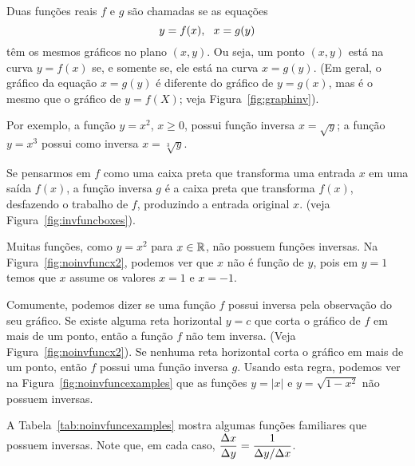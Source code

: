 Duas funções reais $f$ e $g$ são chamadas  se as
equações
$$
  y = f(x), \hspace{1.5ex} x = g(y)
$$
têm os mesmos gráficos no plano $(x, y)$. Ou seja, um ponto $(x, y)$ está na
curva $y = f(x)$ se, e somente se, ele está na curva $x = g(y)$. (Em geral,
o gráfico da equação $x = g(y)$ é diferente do gráfico de $y = g(x)$, mas é
o mesmo que o gráfico de $y = f(X)$; veja Figura~\ref{fig:graphinv}).


Por exemplo, a função $y = x^2$, $x \ge 0$, possui função inversa
$x = \sqrt{y}$; a função $y = x^3$ possui como inversa $x = \sqrt[3]{y}$.

Se pensarmos em $f$ como uma caixa preta que transforma uma entrada $x$
em uma saída $f(x)$, a função inversa $g$ é a caixa preta que transforma
$f(x)$, desfazendo o trabalho de $f$, produzindo a entrada original $x$.
(veja Figura~\ref{fig:invfuncboxes}).


Muitas funções, como $y = x^2$ para $x \in \mathbb{R}$, não possuem funções
inversas. Na Figura~\ref{fig:noinvfuncx2}, podemos ver que $x$ não é
função de $y$, pois em $y = 1$ temos que $x$ assume os valores $x = 1$ e
$x = -1$.


Comumente, podemos dizer se uma função $f$ possui inversa pela observação
do seu gráfico. Se existe alguma reta horizontal $y = c$ que corta o gráfico
de $f$ em mais de um ponto, então a função $f$ não tem inversa.
(Veja Figura~\ref{fig:noinvfuncx2}). Se nenhuma reta horizontal
corta o gráfico em mais de um ponto, então $f$ possui uma função inversa
$g$. Usando esta regra, podemos ver na Figura~\ref{fig:noinvfuncexamples}
que as funções $y = |x|$ e $y = \sqrt{1 - x^2}$ não possuem inversas.


A Tabela~\ref{tab:noinvfuncexamples} mostra algumas funções familiares que
possuem inversas. Note que, em cada caso,
$\dfrac{\Delta{x}}{\Delta{y}} = \dfrac{1}{\Delta{y}/\Delta{x}}$.

